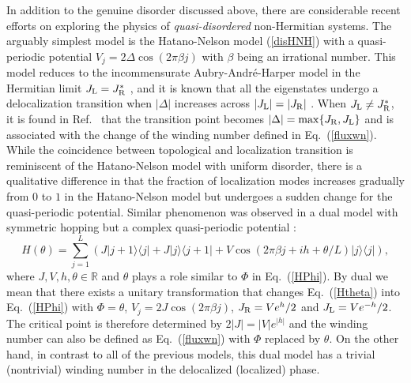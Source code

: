 \documentclass{tADP2e}
\theoremstyle{plain}
\theoremstyle{plain}
\theoremstyle{definition}
\begin{document}
In addition to the genuine disorder discussed above, there are considerable recent efforts on exploring the physics of \emph{quasi-disordered} non-Hermitian systems. The arguably simplest model is the Hatano-Nelson model (\ref{disHNH}) with a quasi-periodic potential $V_j=2\Delta\cos(2\pi\beta j)$ with $\beta$ being an irrational number. This model reduces to the incommensurate Aubry-Andr\'e-Harper model in the Hermitian limit $J_{\rm L}=J_{\rm R}^*$ \cite{SA80}, and it is known that all the eigenstates undergo a delocalization transition when $|\Delta|$ increases across $|J_{\rm L}|=|J_{\rm R}|$ \cite{GT91}. When $J_{\rm L}\neq J_{\rm R}^*$, it is found in Ref.~\cite{JH19} that the transition point becomes $|\Delta|=\max\{J_{\rm R},J_{\rm L}\}$ and is associated with the change of the winding number defined in Eq.~(\ref{fluxwn}). While the coincidence between topological and localization transition is reminiscent of the Hatano-Nelson model with uniform disorder, there is a qualitative difference in that the fraction of localization modes increases gradually from $0$ to $1$ in the Hatano-Nelson model but undergoes a sudden change for the quasi-periodic potential. Similar phenomenon was observed in a dual model with symmetric hopping but a complex quasi-periodic potential \cite{LS19}:  
\begin{equation}
H(\theta)=\sum^L_{j=1} (J|j+1\rangle\langle j| + J|j\rangle\langle j+1|+V\cos (2\pi\beta j + ih+ \theta/L )|j\rangle\langle j|),
\label{Htheta}
\end{equation}
where $J,V,h,\theta\in\mathbb{R}$ and $\theta$ plays a role similar to $\Phi$ in Eq.~(\ref{HPhi}). By dual we mean that there exists a unitary transformation that changes Eq.~(\ref{Htheta}) into Eq.~(\ref{HPhi}) with $\Phi=\theta$, $V_j=2J\cos (2\pi \beta j)$, $J_{\rm R}=Ve^h/2$ and $J_{\rm L}=Ve^{-h}/2$.  The critical point is therefore determined by $2|J|=|V|e^{|h|}$ and the winding number can also be defined as Eq.~(\ref{fluxwn}) with $\Phi$ replaced by $\theta$. On the other hand, in contrast to all of the previous models, this dual model has a trivial (nontrivial) winding number in the delocalized (localized) phase. 
\end{document}
